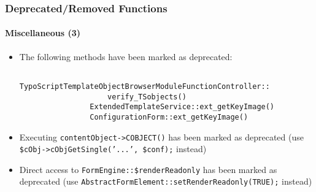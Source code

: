 \begin{frame}[fragile]
	\frametitle{Deprecated/Removed Functions}
	\framesubtitle{Miscellaneous (3)}

	\begin{itemize}
		\item The following methods have been marked as deprecated:

			\begin{lstlisting}
				TypoScriptTemplateObjectBrowserModuleFunctionController::
				    verify_TSobjects()
				ExtendedTemplateService::ext_getKeyImage()
				ConfigurationForm::ext_getKeyImage()
			\end{lstlisting}

 		\item Executing \texttt{contentObject->COBJECT()} has been marked as deprecated\newline
 			\small(use \texttt{\$cObj->cObjGetSingle('...', \$conf);} instead)\normalsize

		\item Direct access to \texttt{FormEngine::\$renderReadonly} has been marked as deprecated\newline
			\small(use \texttt{AbstractFormElement::setRenderReadonly(TRUE);} instead)\normalsize

	\end{itemize}

\end{frame}


